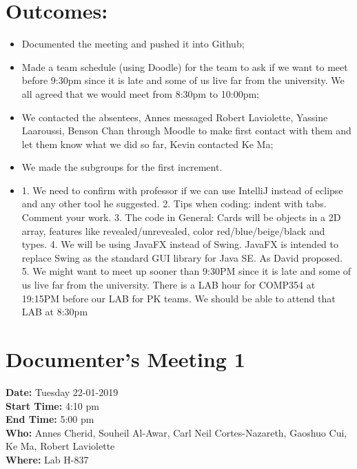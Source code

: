 \documentclass[12pt]{article}
\begin{document}
\section{Outcomes:} 
\begin{itemize}
    \item Documented the meeting and pushed it into Github;
    \item Made a team schedule (using Doodle) for the team to ask if we want to meet before 9:30pm since it is late and some of us live far from the university. We all agreed that we would meet from 8:30pm to 10:00pm;
    \item We contacted the absentees, Annes messaged Robert Laviolette, Yassine Laaroussi, Benson Chan through Moodle to make first contact with them and let them know what we did so far, Kevin contacted Ke Ma;
    \item We made the subgroups for the first increment.
    \item 1.	We need to confirm with professor if we can use IntelliJ instead of eclipse and any other tool he suggested.
    2.	Tips when coding: indent with tabs. Comment your work.
    3.	The code in General: Cards will be objects in a 2D array, features like revealed/unrevealed, color red/blue/beige/black and types.
    4.	We will be using JavaFX instead of Swing. JavaFX is intended to replace Swing as the standard GUI library for Java SE. As David proposed. 
    5.	We might want to meet up sooner than 9:30PM since it is late and some of us live far from the university. There is a LAB hour for COMP354 at 19:15PM before our LAB for PK teams. We should be able to attend that LAB at 8:30pm\\
    
    
\end{itemize}
\clearpage
\section {Documenter's Meeting 1}
{\bf Date:} Tuesday 22-01-2019\\
{\bf Start Time:} 4:10 pm\\
{\bf End Time:} 5:00 pm \\
{\bf Who:} Annes Cherid, Souheil Al-Awar, Carl Neil Cortes-Nazareth, Gaoshuo Cui, Ke Ma, Robert Laviolette\\
{\bf Where:} Lab H-837 \\
\end{document}
